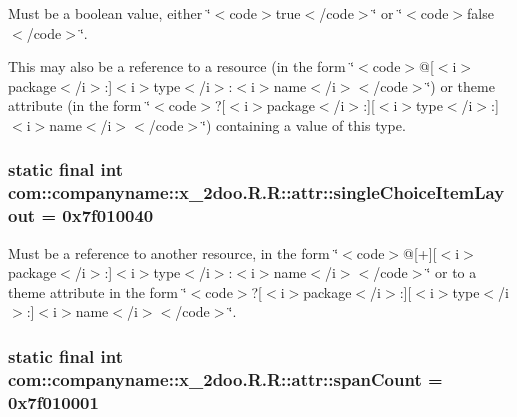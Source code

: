 Must be a boolean value, either \char`\"{}$<$code$>$true$<$/code$>$\char`\"{} or \char`\"{}$<$code$>$false$<$/code$>$\char`\"{}. 

This may also be a reference to a resource (in the form \char`\"{}$<$code$>$@\mbox{[}$<$i$>$package$<$/i$>$:\mbox{]}$<$i$>$type$<$/i$>$:$<$i$>$name$<$/i$>$$<$/code$>$\char`\"{}) or theme attribute (in the form \char`\"{}$<$code$>$?\mbox{[}$<$i$>$package$<$/i$>$:\mbox{]}\mbox{[}$<$i$>$type$<$/i$>$:\mbox{]}$<$i$>$name$<$/i$>$$<$/code$>$\char`\"{}) containing a value of this type. \hypertarget{classcom_1_1companyname_1_1x__2doo_1_1_r_1_1attr_de7601fbaca8e284824a49641ce1e3ac}{
\subsubsection[{singleChoiceItemLayout}]{\setlength{\rightskip}{0pt plus 5cm}static final int com::companyname::x\_\-2doo.R.R::attr::singleChoiceItemLayout = 0x7f010040}}
\label{classcom_1_1companyname_1_1x__2doo_1_1_r_1_1attr_de7601fbaca8e284824a49641ce1e3ac}


Must be a reference to another resource, in the form \char`\"{}$<$code$>$@\mbox{[}+\mbox{]}\mbox{[}$<$i$>$package$<$/i$>$:\mbox{]}$<$i$>$type$<$/i$>$:$<$i$>$name$<$/i$>$$<$/code$>$\char`\"{} or to a theme attribute in the form \char`\"{}$<$code$>$?\mbox{[}$<$i$>$package$<$/i$>$:\mbox{]}\mbox{[}$<$i$>$type$<$/i$>$:\mbox{]}$<$i$>$name$<$/i$>$$<$/code$>$\char`\"{}. \hypertarget{classcom_1_1companyname_1_1x__2doo_1_1_r_1_1attr_46670bdd33dae861b08f43b868c9147a}{
\subsubsection[{spanCount}]{\setlength{\rightskip}{0pt plus 5cm}static final int com::companyname::x\_\-2doo.R.R::attr::spanCount = 0x7f010001}}
\label{classcom_1_1companyname_1_1x__2doo_1_1_r_1_1attr_46670bdd33dae861b08f43b868c9147a}


